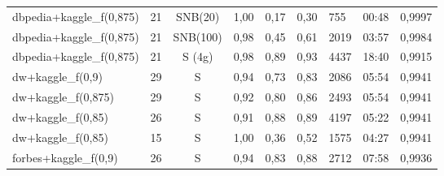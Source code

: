 \documentclass[11pt,titlepage,oneside,openany]{article}
\begin{document}
\begin{table}[]
\begin{tabular}{llcllllll}
		\rowcolor[HTML]{DDEBF7} 
		dbpedia+kaggle\_f(0,875)    & 21                              & SNB(20)    & 1,00                           & 0,17                           & 0,30                            & 755                                 & 00:48                             & 0,9997                          \\
		\rowcolor[HTML]{DDEBF7} 
		dbpedia+kaggle\_f(0,875)    & 21                              & SNB(100)   & 0,98                           & 0,45                           & 0,61                            & 2019                                & 03:57                             & 0,9984                          \\
		\rowcolor[HTML]{DDEBF7} 
		dbpedia+kaggle\_f(0,875)    & 21                              & S (4g)     & 0,98                           & 0,89                           & 0,93                            & 4437                                & 18:40                             & 0,9915                          \\
		\rowcolor[HTML]{FFFFCC} 
		dw+kaggle\_f(0,9)           & 29                              & S          & 0,94                           & 0,73                           & 0,83                            & 2086                                & 05:54                             & 0,9941                          \\
		dw+kaggle\_f(0,875)         & 29                              & S          & 0,92                           & 0,80                           & 0,86                            & 2493                                & 05:54                             & 0,9941                          \\
		dw+kaggle\_f(0,85)          & 26                              & S          & 0,91                           & 0,88                           & 0,89                            & 4197                                & 05:22                             & 0,9941                          \\
		\rowcolor[HTML]{FCCCC8} 
		dw+kaggle\_f(0,85)          & 15                              & S          & 1,00                           & 0,36                           & 0,52                            & 1575                                & 04:27                             & 0,9941                          \\
		\rowcolor[HTML]{FFFFCC} 
		forbes+kaggle\_f(0,9)       & 26                              & S          & 0,94                           & 0,83                           & 0,88                            & 2712                                & 07:58                             & 0,9936                          \\

\end{tabular}
\end{table}
\end{document}
